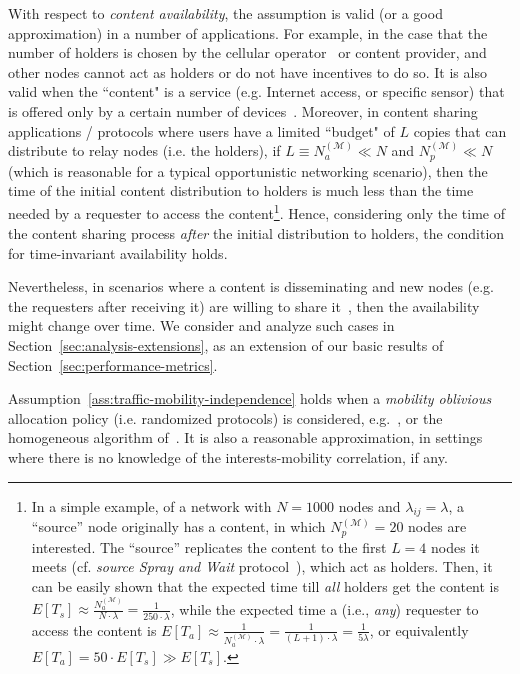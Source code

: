 \documentclass[journal]{IEEEtran}
\newcommand{\Np}{N_{p}^{(\mathcal{M})}}
\newcommand{\Na}{N_{a}^{(\mathcal{M})}}
\newcommand{\revisionRed}[1]{{#1}}\newcommand{\red}[1]{{#1}}
\begin{document}
\red{With respect to \textit{content availability}, the assumption is valid (or a good approximation) in a number of applications. For example, in the case that the number of holders is chosen by the cellular operator~\cite{Hui-Offloading,multiple-offloading} or content provider, and other nodes cannot act as holders or do not have incentives to do so. It is also valid when the ``content" is a service (e.g. Internet access, or specific sensor) that is offered only by a certain number of devices~\cite{Scampi-OppComp}. Moreover, in content sharing applications / protocols where users have a limited ``budget" of $L$ copies that can distribute to relay nodes (i.e. the holders), if $L\equiv \Na \ll N$ and $\Np\ll N$ (which is reasonable for a typical opportunistic networking scenario), then the time of the initial content distribution to holders is much less than the time needed by a requester to access the content\footnote{\revisionRed{In a simple example, of a network with $N=1000$ nodes and $\lambda_{ij}=\lambda$, a ``source'' node originally has a content, in which $\Np=20$ nodes are interested. The ``source'' replicates the content to the first $L=4$ nodes it meets (cf. \textit{source Spray and Wait} protocol~\cite{spray-and-wait}), which act as holders. Then, it can be easily shown that the expected time till \textit{all} holders get the content is $E[T_{s}] \approx \frac{\Na}{N\cdot \lambda} = \frac{1}{250\cdot \lambda}$, while the expected time a (i.e., \textit{any}) requester to access the content is $E[T_{a}] \approx \frac{1}{\Na\cdot\lambda} = \frac{1}{(L+1)\cdot\lambda}= \frac{1}{5\lambda}$, or equivalently $E[T_{a}] = 50\cdot E[T_{s}]\gg E[T_{s}]$.}}. Hence, considering only the time of the content sharing process \textit{after} the initial distribution to holders, the condition for time-invariant availability holds.}


\red{Nevertheless, in scenarios where a content is disseminating and new nodes (e.g. the requesters after receiving it) are willing to share it~\cite{offloading-wowmom11}, then the availability might change over time. We consider and analyze such cases in Section~\ref{sec:analysis-extensions}, as an extension of our basic results of Section~\ref{sec:performance-metrics}.}



\red{Assumption~\ref{ass:traffic-mobility-independence} holds when a \textit{mobility oblivious} allocation policy (i.e. randomized protocols) is considered, e.g.~\cite{CEDO}, or the homogeneous algorithm of~\cite{multiple-offloading}. It is also a reasonable approximation, in settings where there is no knowledge of the interests-mobility correlation, if any.}
\end{document}
